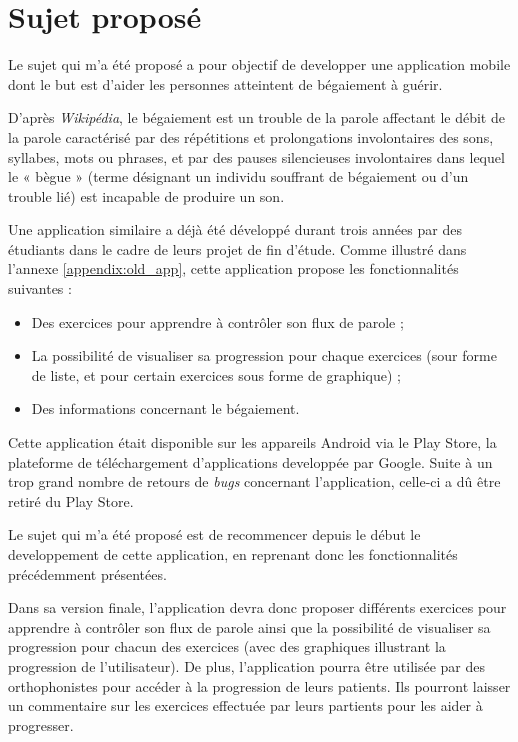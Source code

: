 \section{Sujet proposé}

Le sujet qui m'a été proposé a pour objectif de developper une application mobile dont le but est d'aider les personnes atteintent de bégaiement à guérir.

D'après \textit{Wikipédia}\cite{def_wiki}, le bégaiement est un trouble de la parole affectant le débit de la parole caractérisé par des répétitions et prolongations involontaires des sons, syllabes, mots ou phrases, et par des pauses silencieuses involontaires dans lequel le « bègue » (terme désignant un individu souffrant de bégaiement ou d'un trouble lié) est incapable de produire un son.

Une application similaire a déjà été développé durant trois années par des étudiants dans le cadre de leurs projet de fin d'étude. Comme illustré dans l'annexe \ref{appendix:old_app}, cette application propose les fonctionnalités suivantes :

\begin{itemize}
  \item Des exercices pour apprendre à contrôler son flux de parole ;
  \item La possibilité de visualiser sa progression pour chaque exercices (sour forme de liste, et pour certain exercices sous forme de graphique) ;
  \item Des informations concernant le bégaiement.
\end{itemize}

Cette application était disponible sur les appareils Android via le Play Store, la plateforme de téléchargement d'applications developpée par Google. Suite à un trop grand nombre de retours de \textit{bugs} concernant l'application, celle-ci a dû être retiré du Play Store.

Le sujet qui m'a été proposé est de recommencer depuis le début le developpement de cette application, en reprenant donc les fonctionnalités précédemment présentées.

Dans sa version finale, l'application devra donc proposer différents exercices pour apprendre à contrôler son flux de parole ainsi que la possibilité de visualiser sa progression pour chacun des exercices (avec des graphiques illustrant la progression de l'utilisateur). De plus, l'application pourra être utilisée par des orthophonistes pour accéder à la progression de leurs patients. Ils pourront laisser un commentaire sur les exercices effectuée par leurs partients pour les aider à progresser.

